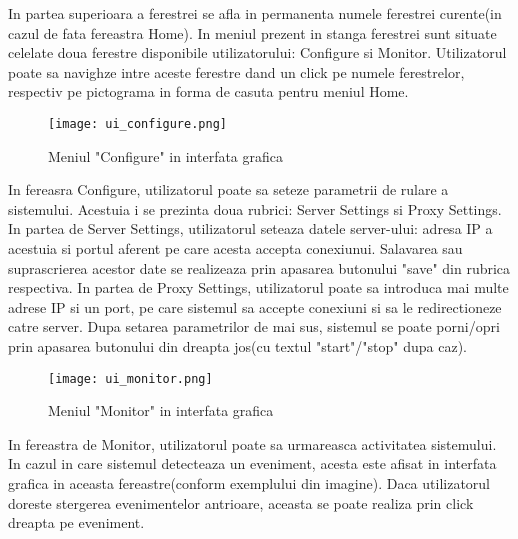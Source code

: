 In partea superioara a ferestrei se afla in permanenta numele ferestrei curente(in cazul de fata fereastra Home). In meniul prezent in stanga ferestrei sunt situate celelate doua ferestre disponibile utilizatorului: Configure si Monitor. Utilizatorul poate sa navighze intre aceste ferestre dand un click pe numele ferestrelor, respectiv pe pictograma in forma de casuta pentru meniul Home. \\

\begin{figure}[h]
	\centering
	\texttt{[image: ui\_configure.png]}
	\caption{Meniul "Configure" in interfata grafica}
	\label{fig:ui_configure}
\end{figure}

In fereasra Configure, utilizatorul poate sa seteze parametrii de rulare a sistemului. Acestuia i se prezinta doua rubrici: Server Settings si Proxy Settings. In partea de Server Settings, utilizatorul seteaza datele server-ului: adresa IP a acestuia si portul aferent pe care acesta accepta conexiunui. Salavarea sau suprascrierea acestor date se realizeaza prin apasarea butonului "save" din rubrica respectiva. In partea de Proxy Settings, utilizatorul poate sa introduca mai multe adrese IP si un port, pe care sistemul sa accepte conexiuni si sa le redirectioneze catre server. Dupa setarea parametrilor de mai sus, sistemul se poate porni/opri prin apasarea butonului din dreapta jos(cu textul "start"/"stop" dupa caz).
\newpage
\begin{figure}[h]
	\centering
	\texttt{[image: ui\_monitor.png]}
	\caption{Meniul "Monitor" in interfata grafica}
	\label{fig:ui_monitor}
\end{figure}

In fereastra de Monitor, utilizatorul poate sa urmareasca activitatea sistemului. In cazul in care sistemul detecteaza un eveniment, acesta este afisat in interfata grafica in aceasta fereastre(conform exemplului din imagine). Daca utilizatorul doreste stergerea evenimentelor antrioare, aceasta se poate realiza prin click dreapta pe eveniment.